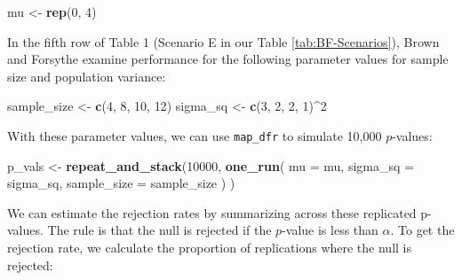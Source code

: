 \documentclass[
]{book}
\newenvironment{Shaded}{\begin{snugshade}}{\end{snugshade}}
\newcommand{\AttributeTok}[1]{\textcolor[rgb]{0.13,0.29,0.53}{#1}}
\newcommand{\DecValTok}[1]{\textcolor[rgb]{0.00,0.00,0.81}{#1}}
\newcommand{\FloatTok}[1]{\textcolor[rgb]{0.00,0.00,0.81}{#1}}
\newcommand{\FunctionTok}[1]{\textcolor[rgb]{0.13,0.29,0.53}{\textbf{#1}}}
\newcommand{\NormalTok}[1]{#1}
\newcommand{\OtherTok}[1]{\textcolor[rgb]{0.56,0.35,0.01}{#1}}
\newcommand{\SpecialCharTok}[1]{\textcolor[rgb]{0.81,0.36,0.00}{\textbf{#1}}}
\begin{document}
\begin{Shaded}
\begin{Highlighting}[]
\NormalTok{mu }\OtherTok{\textless{}{-}} \FunctionTok{rep}\NormalTok{(}\DecValTok{0}\NormalTok{, }\DecValTok{4}\NormalTok{)}
\end{Highlighting}
\end{Shaded}

In the fifth row of Table 1 (Scenario E in our Table \ref{tab:BF-Scenarios}), Brown and Forsythe examine performance for the following parameter values for sample size and population variance:

\begin{Shaded}
\begin{Highlighting}[]
\NormalTok{sample\_size }\OtherTok{\textless{}{-}} \FunctionTok{c}\NormalTok{(}\DecValTok{4}\NormalTok{, }\DecValTok{8}\NormalTok{, }\DecValTok{10}\NormalTok{, }\DecValTok{12}\NormalTok{)}
\NormalTok{sigma\_sq }\OtherTok{\textless{}{-}} \FunctionTok{c}\NormalTok{(}\DecValTok{3}\NormalTok{, }\DecValTok{2}\NormalTok{, }\DecValTok{2}\NormalTok{, }\DecValTok{1}\NormalTok{)}\SpecialCharTok{\^{}}\DecValTok{2}
\end{Highlighting}
\end{Shaded}

With these parameter values, we can use \texttt{map\_dfr} to simulate 10,000 \(p\)-values:

\begin{Shaded}
\begin{Highlighting}[]
\NormalTok{p\_vals }\OtherTok{\textless{}{-}} \FunctionTok{repeat\_and\_stack}\NormalTok{(}\DecValTok{10000}\NormalTok{, }
  \FunctionTok{one\_run}\NormalTok{(}
    \AttributeTok{mu =}\NormalTok{ mu,}
    \AttributeTok{sigma\_sq =}\NormalTok{ sigma\_sq,}
    \AttributeTok{sample\_size =}\NormalTok{ sample\_size}
\NormalTok{  ) }
\NormalTok{)}
\end{Highlighting}
\end{Shaded}

We can estimate the rejection rates by summarizing across these replicated p-values.
The rule is that the null is rejected if the \(p\)-value is less than \(\alpha\).
To get the rejection rate, we calculate the proportion of replications where the null is rejected:

\begin{Shaded}
\end{Shaded}
\end{document}
